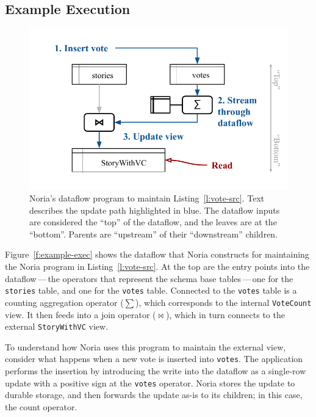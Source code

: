 \subsection{Example Execution}

\begin{figure}[t]
  \centering
  \includegraphics{diagrams/Example Execution.pdf}
  \caption{Noria's dataflow program to maintain Listing~\ref{l:vote-src}. Text
  describes the update path highlighted in blue. The dataflow inputs are
  considered the ``top'' of the dataflow, and the leaves are at the ``bottom''.
  Parents are ``upstream'' of their ``downstream'' children.}
  \label{f:example-exec}
\end{figure}

Figure~\vref{f:example-exec} shows the dataflow that Noria constructs for
maintaining the Noria program in Listing~\vref{l:vote-src}. At the top are the
entry points into the dataflow\,---\,the operators that represent the schema
base tables\,---\,one for the \texttt{stories} table, and one for the
\texttt{votes} table. Connected to the \texttt{votes} table is a counting
aggregation operator ($\sum$), which corresponds to the internal
\texttt{VoteCount} view. It then feeds into a join operator ($\bowtie$), which
in turn connects to the external \texttt{StoryWithVC} view.

To understand how Noria uses this program to maintain the external view,
consider what happens when a new vote is inserted into \texttt{votes}. The
application performs the insertion by introducing the write into the dataflow as
a single-row update with a positive sign at the \texttt{votes} operator. Noria
stores the update to durable storage, and then forwards the update as-is to its
children; in this case, the count operator.

